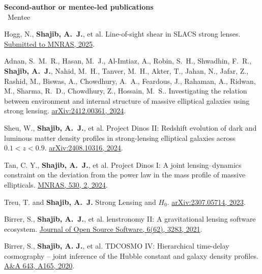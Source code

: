 \documentclass[margin, line]{res}
\begin{document}
\begin{resume}
\textbf{Second-author or mentee-led publications}
\\ \mentee\ Mentee
\begin{etaremune}
	\item Hogg, N., \textbf{Shajib, A.~J.}, et al. Line-of-sight shear in SLACS strong lenses. \href{https://ui.adsabs.harvard.edu/abs/2025arXiv250116292H/abstract}{Submitted to MNRAS, 2025}.
	\item Adnan, S.~M.~R.{\mentee}, Hasan, M.~J.{\mentee}, Al-Imtiaz, A.{\mentee}, Robin, S.~H.{\mentee}, Shwadhin, F.~R.{\mentee}, \textbf{Shajib, A.~J.}, Nahid, M.~H.{\mentee}, Tanver, M.~H.{\mentee}, Akter, T.{\mentee}, Jahan, N.{\mentee}, Jafar, Z.{\mentee}, Rashid, M.{\mentee}, Biswas, A.{\mentee}, Chowdhury, A.~A.{\mentee}, Feardous, J.{\mentee}, Rahaman, A.{\mentee}, Ridwan, M.{\mentee}, Sharma, R.~D.{\mentee}, Chowdhury, Z.{\mentee}, Hossain, M.~S.{\mentee}. Investigating the relation between environment and internal structure of massive elliptical galaxies using strong lensing. \href{https://ui.adsabs.harvard.edu/abs/2024arXiv241200361R/abstract}{arXiv:2412.00361, 2024}.
	\item Sheu, W.{\mentee},  \textbf{Shajib, A.~J.}, et al. Project Dinos II: Redshift evolution of dark and luminous matter density profiles in strong-lensing elliptical galaxies across  $0.1<z<0.9$. \href{https://ui.adsabs.harvard.edu/abs/2024arXiv240810316S/abstract}{arXiv:2408.10316, 2024}.
	\item Tan, C. Y.{\mentee}, \textbf{Shajib, A.~J.}, et al. Project Dinos I: A joint lensing--dynamics constraint on the deviation from the power law in the mass profile of massive ellipticals. \href{https://ui.adsabs.harvard.edu/abs/2023arXiv231109307T/abstract}{MNRAS, 530, 2, 2024}.
	\item Treu, T. and \textbf{Shajib, A.~J.} Strong Lensing and $H_0$. \href{https://arxiv.org/abs/2307.05714}{arXiv:2307.05714, 2023}.
	\item Birrer, S., \textbf{Shajib, A.~J.}, et al. lenstronomy II: A gravitational lensing software ecosystem. \href{https://joss.theoj.org/papers/10.21105/joss.03283}{Journal of Open Source Software, 6(62), 3283, 2021}.
	\item Birrer, S., \textbf{Shajib, A. J.}, et al. TDCOSMO IV: Hierarchical time-delay cosmography -- joint inference of the Hubble constant and galaxy density profiles. \href{https://doi.org/10.1051/0004-6361/202038861}{A\&A 643, A165, 2020}.
\end{etaremune}


\end{resume}
\end{document}
